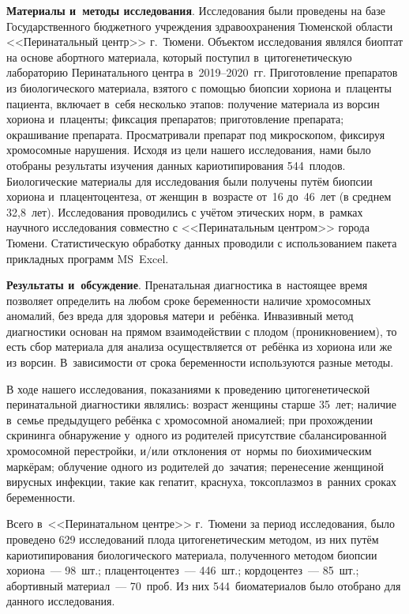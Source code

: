 \textbf{Материалы и~методы исследования}. Исследования были проведены на базе Государственного бюджетного учреждения здравоохранения Тюменской области <<Перинатальный центр>> г.~Тюмени. Объектом исследования являлся биоптат на основе абортного материала, который поступил в~цитогенетическую лабораторию Перинатального центра в~2019--2020~гг. Приготовление препаратов из биологического материала, взятого с помощью биопсии хориона и~плаценты пациента, включает в~себя несколько этапов: получение материала из ворсин хориона и~плаценты; фиксация препаратов; приготовление препарата; окрашивание препарата. Просматривали препарат под микроскопом, фиксируя хромосомные нарушения. Исходя из цели нашего исследования, нами было отобраны результаты изучения данных кариотипирования 544~плодов. Биологические материалы для исследования были получены путём биопсии хориона и~плацентоцентеза, от женщин в~возрасте от~16 до~46~лет (в среднем 32,8~лет).  Исследования проводились с учётом этических норм, в~рамках научного исследования совместно с <<Перинатальным центром>> города Тюмени. Статистическую обработку данных проводили с использованием пакета прикладных программ MS~Excel.

\textbf{Результаты и~обсуждение}. Пренатальная диагностика в~настоящее время позволяет определить на любом сроке беременности наличие хромосомных аномалий, без вреда для здоровья матери и~ребёнка. Инвазивный метод диагностики основан на прямом взаимодействии с плодом (проникновением), то есть сбор материала для анализа осуществляется от~ребёнка из хориона или же из ворсин. В~зависимости от срока беременности используются разные методы.

В ходе нашего исследования, показаниями к проведению цитогенетической перинатальной диагностики являлись: возраст женщины старше 35~лет; наличие в~семье предыдущего ребёнка с хромосомной аномалией; при прохождении скрининга обнаружение у~одного из родителей присутствие сбалансированной хромосомной перестройки, и/или отклонения от~нормы по биохимическим маркёрам; облучение одного из родителей до~зачатия; перенесение женщиной вирусных инфекции, такие как гепатит, краснуха, токсоплазмоз в~ранних сроках беременности.

Всего в~<<Перинатальном центре>> г.~Тюмени за период исследования, было проведено 629 исследований плода цитогенетическим методом, из них путём кариотипирования биологического материала, полученного методом биопсии хориона~--- 98~шт.; плацентоцентез~--- 446~шт.; кордоцентез~--- 85~шт.; абортивный материал~--- 70~проб. Из них 544~биоматериалов было отобрано для данного исследования.

